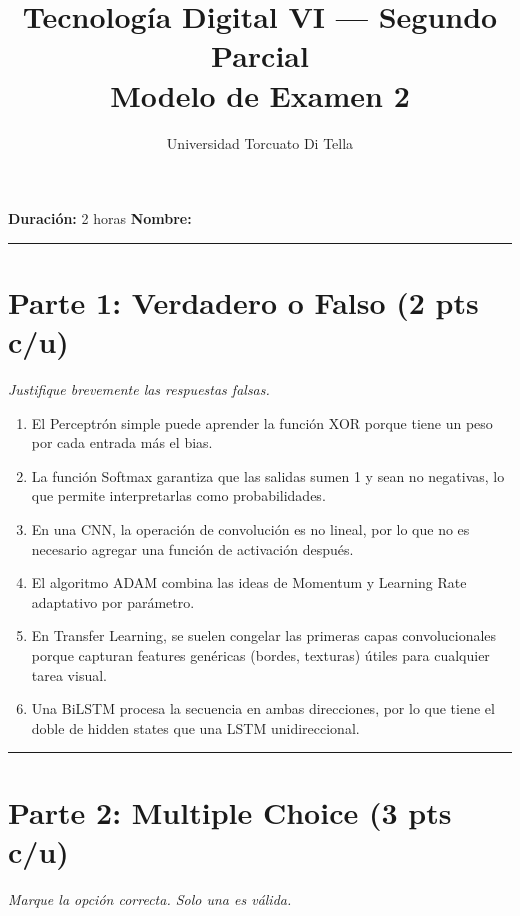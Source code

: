 \documentclass[12pt,a4paper]{article}
\title{\textbf{Tecnología Digital VI --- Segundo Parcial} \\ Modelo de Examen 2}
\author{Universidad Torcuato Di Tella}
\date{}
\begin{document}
\maketitle
\noindent\textbf{Duración:} 2 horas \hfill \textbf{Nombre:} \hrulefill

\vspace{0.5cm}
\hrule
\vspace{0.5cm}

\section*{Parte 1: Verdadero o Falso (2 pts c/u)}
\textit{Justifique brevemente las respuestas falsas.}

\begin{enumerate}[label=\alph*)]
    \item El Perceptrón simple puede aprender la función XOR porque tiene un peso por cada entrada más el bias.

    \item La función Softmax garantiza que las salidas sumen 1 y sean no negativas, lo que permite interpretarlas como probabilidades.

    \item En una CNN, la operación de convolución es no lineal, por lo que no es necesario agregar una función de activación después.

    \item El algoritmo ADAM combina las ideas de Momentum y Learning Rate adaptativo por parámetro.

    \item En Transfer Learning, se suelen congelar las primeras capas convolucionales porque capturan features genéricas (bordes, texturas) útiles para cualquier tarea visual.

    \item Una BiLSTM procesa la secuencia en ambas direcciones, por lo que tiene el doble de hidden states que una LSTM unidireccional.
\end{enumerate}

\vspace{0.5cm}
\hrule
\vspace{0.5cm}

\section*{Parte 2: Multiple Choice (3 pts c/u)}
\textit{Marque la opción correcta. Solo una es válida.}
\end{document}
